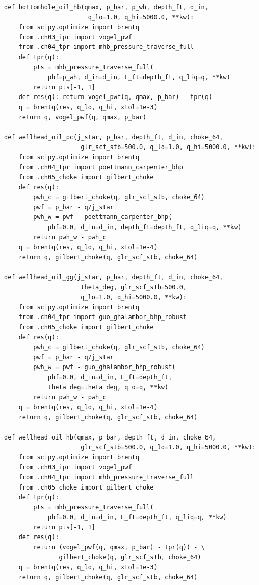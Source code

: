 \documentclass[10pt,a4paper,openany]{book}
\begin{document}
\begin{lstlisting}
def bottomhole_oil_hb(qmax, p_bar, p_wh, depth_ft, d_in,
                       q_lo=1.0, q_hi=5000.0, **kw):
    from scipy.optimize import brentq
    from .ch03_ipr import vogel_pwf
    from .ch04_tpr import mhb_pressure_traverse_full
    def tpr(q):
        pts = mhb_pressure_traverse_full(
            phf=p_wh, d_in=d_in, L_ft=depth_ft, q_liq=q, **kw)
        return pts[-1, 1]
    def res(q): return vogel_pwf(q, qmax, p_bar) - tpr(q)
    q = brentq(res, q_lo, q_hi, xtol=1e-3)
    return q, vogel_pwf(q, qmax, p_bar)

def wellhead_oil_pc(j_star, p_bar, depth_ft, d_in, choke_64,
                     glr_scf_stb=500.0, q_lo=1.0, q_hi=5000.0, **kw):
    from scipy.optimize import brentq
    from .ch04_tpr import poettmann_carpenter_bhp
    from .ch05_choke import gilbert_choke
    def res(q):
        pwh_c = gilbert_choke(q, glr_scf_stb, choke_64)
        pwf = p_bar - q/j_star
        pwh_w = pwf - poettmann_carpenter_bhp(
            phf=0.0, d_in=d_in, depth_ft=depth_ft, q_liq=q, **kw)
        return pwh_w - pwh_c
    q = brentq(res, q_lo, q_hi, xtol=1e-4)
    return q, gilbert_choke(q, glr_scf_stb, choke_64)

def wellhead_oil_gg(j_star, p_bar, depth_ft, d_in, choke_64,
                     theta_deg, glr_scf_stb=500.0,
                     q_lo=1.0, q_hi=5000.0, **kw):
    from scipy.optimize import brentq
    from .ch04_tpr import guo_ghalambor_bhp_robust
    from .ch05_choke import gilbert_choke
    def res(q):
        pwh_c = gilbert_choke(q, glr_scf_stb, choke_64)
        pwf = p_bar - q/j_star
        pwh_w = pwf - guo_ghalambor_bhp_robust(
            phf=0.0, d_in=d_in, L_ft=depth_ft,
            theta_deg=theta_deg, q_o=q, **kw)
        return pwh_w - pwh_c
    q = brentq(res, q_lo, q_hi, xtol=1e-4)
    return q, gilbert_choke(q, glr_scf_stb, choke_64)

def wellhead_oil_hb(qmax, p_bar, depth_ft, d_in, choke_64,
                     glr_scf_stb=500.0, q_lo=1.0, q_hi=5000.0, **kw):
    from scipy.optimize import brentq
    from .ch03_ipr import vogel_pwf
    from .ch04_tpr import mhb_pressure_traverse_full
    from .ch05_choke import gilbert_choke
    def tpr(q):
        pts = mhb_pressure_traverse_full(
            phf=0.0, d_in=d_in, L_ft=depth_ft, q_liq=q, **kw)
        return pts[-1, 1]
    def res(q):
        return (vogel_pwf(q, qmax, p_bar) - tpr(q)) - \
               gilbert_choke(q, glr_scf_stb, choke_64)
    q = brentq(res, q_lo, q_hi, xtol=1e-3)
    return q, gilbert_choke(q, glr_scf_stb, choke_64)


\end{lstlisting}
\end{document}
